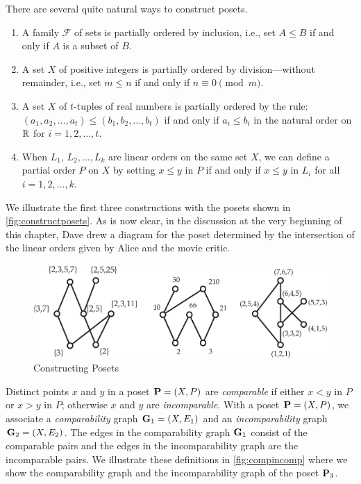 \begin{example}\label{exa:construct}
There are several quite natural ways to construct posets.
\begin{enumerate}
\item A family $\mathcal{F}$ of sets is partially ordered by
inclusion, i.e., set $A\le B$ if and only if $A$ is a subset of
$B$.  
\item A set $X$ of positive integers is partially ordered by
division---without remainder, i.e., set $m\le n$ if and only if
$n\equiv 0\pmod{m}$.  
\item A set $X$ of $t$-tuples of real numbers is
partially ordered by the rule: \\
$(a_1,a_2,\dots,a_t)\le (b_1,b_2,\dots,b_t)$ if
and only if $a_i\le b_i$ in the natural order on $\mathbb{R}$ for $i=1,2,\dots,t$.
\item When $L_1$, $L_2,\dots,L_k$ are linear orders on the same set
$X$, we can define a partial order $P$ on  $X$ by setting
$x\le y$ in $P$ if and only if $x\le y$ in $L_i$ for all $i=1,2,\dots,k$.
\end{enumerate}
We illustrate the first three constructions with the posets shown in 
\autoref{fig:constructposets}.  As is now clear, in the discussion at the 
very beginning of this chapter, Dave drew a diagram for the poset determined by 
the intersection of the linear orders given by Alice and the movie critic.
\end{example}

\begin{figure}
\begin{center}
\includegraphics*[scale=.4]{posets-figs/constructposets.pdf}
\caption{Constructing Posets}
\label{fig:constructposets}
\end{center}
\end{figure}

Distinct points $x$ and $y$ in a poset $\mathbf{P}=(X,P)$ are \textit{comparable}
if either $x<y$ in $P$ or $x>y$ in $P$; otherwise $x$ and $y$ are
\textit{incomparable}.  With a poset $\mathbf{P}=(X,P)$, we associate a 
\textit{comparability} graph ${\mathbf{G}}_1=(X,E_1)$ and an 
\textit{incomparability} graph ${\mathbf{G}}_2=(X,E_2)$. The edges in the 
comparability graph ${\mathbf{G}}_1$ consist of the comparable pairs and 
the edges in the incomparability graph are the incomparable pairs.  We 
illustrate these definitions in \autoref{fig:compincomp}
where we show the comparability graph and the incomparability graph
of the poset $\mathbf{P}_3$.

